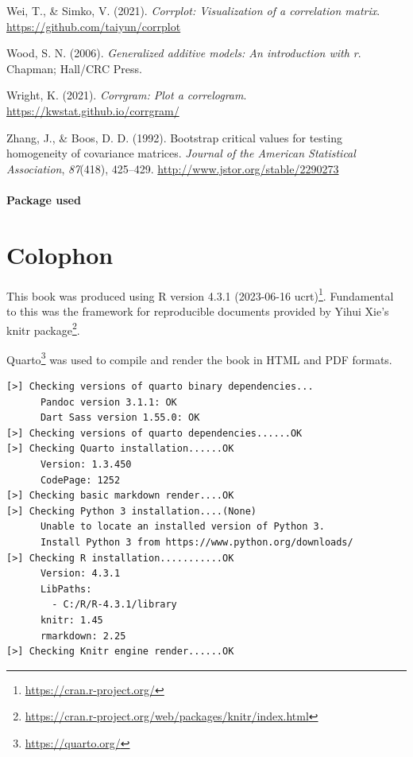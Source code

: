 \documentclass[
  letterpaper,
  10pt,
  krantz2]{krantz}
\newlength{\cslhangindent}
\newlength{\cslentryspacingunit} %
\newenvironment{CSLReferences}[2] %
 {%
  \setlength{\parindent}{0pt}
  \ifodd #1
  \let\oldpar\par
  \def\par{\hangindent=\cslhangindent\oldpar}
  \fi
  \setlength{\parskip}{#2\cslentryspacingunit}
 }%
 {}
\providecommand{\href}[2]{#2\footnote{\url{#1}}}
\begin{document}
\begin{CSLReferences}{1}{0}
\leavevmode{}%
Wei, T., \& Simko, V. (2021). \emph{Corrplot: Visualization of a
correlation matrix}. \url{https://github.com/taiyun/corrplot}

\leavevmode{}%
Wood, S. N. (2006). \emph{Generalized additive models: An introduction
with r}. Chapman; Hall/CRC Press.

\leavevmode{}%
Wright, K. (2021). \emph{Corrgram: Plot a correlogram}.
\url{https://kwstat.github.io/corrgram/}

\leavevmode{}%
Zhang, J., \& Boos, D. D. (1992). Bootstrap critical values for testing
homogeneity of covariance matrices. \emph{Journal of the American
Statistical Association}, \emph{87}(418), 425--429.
\url{http://www.jstor.org/stable/2290273}

\end{CSLReferences}

\hypertarget{package-used}{%
\subsubsection*{Package used}\label{package-used}}


\hypertarget{colophon}{%
\chapter*{Colophon}\label{colophon}}


This book was produced using \href{https://cran.r-project.org/}{R
version 4.3.1 (2023-06-16 ucrt)}. Fundamental to this was the framework
for reproducible documents provided by Yihui Xie's
\href{https://cran.r-project.org/web/packages/knitr/index.html}{knitr
package}.

\href{https://quarto.org/}{Quarto} was used to compile and render the
book in HTML and PDF formats.

\begin{verbatim}
[>] Checking versions of quarto binary dependencies...
      Pandoc version 3.1.1: OK
      Dart Sass version 1.55.0: OK
[>] Checking versions of quarto dependencies......OK
[>] Checking Quarto installation......OK
      Version: 1.3.450
      CodePage: 1252
[>] Checking basic markdown render....OK
[>] Checking Python 3 installation....(None)
      Unable to locate an installed version of Python 3.
      Install Python 3 from https://www.python.org/downloads/
[>] Checking R installation...........OK
      Version: 4.3.1
      LibPaths:
        - C:/R/R-4.3.1/library
      knitr: 1.45
      rmarkdown: 2.25
[>] Checking Knitr engine render......OK
\end{verbatim}
\end{document}
